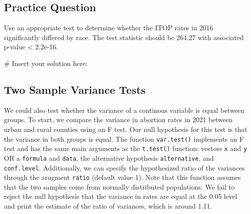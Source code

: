 \documentclass[
  letterpaper,
]{krantz}
\makeatletter
\newenvironment{Shaded}{\begin{snugshade}}{\end{snugshade}}
\newcommand{\CommentTok}[1]{\textcolor[rgb]{0.37,0.37,0.37}{#1}}
\newcommand{\FunctionTok}[1]{\textcolor[rgb]{0.28,0.35,0.67}{#1}}
\newcommand{\NormalTok}[1]{\textcolor[rgb]{0.00,0.23,0.31}{#1}}
\newcommand{\OtherTok}[1]{\textcolor[rgb]{0.00,0.23,0.31}{#1}}
\newcommand{\SpecialCharTok}[1]{\textcolor[rgb]{0.37,0.37,0.37}{#1}}
\newenvironment{kframe}{%
\medskip{}
\setlength{\fboxsep}{.8em}
 \def\at@end@of@kframe{}%
 \ifinner\ifhmode%
  \def\at@end@of@kframe{\end{minipage}}%
  \begin{minipage}{\columnwidth}%
 \fi\fi%
 \def\FrameCommand##1{\hskip\@totalleftmargin \hskip-\fboxsep
 \colorbox{shadecolor}{##1}\hskip-\fboxsep
     \hskip-\linewidth \hskip-\@totalleftmargin \hskip\columnwidth}%
 \MakeFramed {\advance\hsize-\width
   \@totalleftmargin\z@ \linewidth\hsize
   \@setminipage}}%
 {\par\unskip\endMakeFramed%
 \at@end@of@kframe}
\renewenvironment{Shaded}{\begin{kframe}}{\end{kframe}}
\makeatother
\begin{document}
\hypertarget{practice-question-18}{%
\subsection{Practice Question}\label{practice-question-18}}

Use an appropriate test to determine whether the ITOP rates in 2016
significantly differed by race. The test statistic should be 264.27 with
associated p-value \textless{} 2.2e-16.

\begin{Shaded}
\begin{Highlighting}[]
\CommentTok{\# Insert your solution here:}
\end{Highlighting}
\end{Shaded}

\hypertarget{two-sample-variance-tests}{%
\subsection{Two Sample Variance Tests}\label{two-sample-variance-tests}}

We could also test whether the variance of a continous variable is equal
between groups. To start, we compare the variance in abortion rates in
2021 between urban and rural counties using an F test. Our null
hypothesis for this test is that the variance in both groups is equal.
The function \texttt{var.test()} implements an F test and has the same
main arguments as the \texttt{t.test()} function: vectors \texttt{x} and
\texttt{y} OR a \texttt{formula} and \texttt{data}, the alternative
hypothesis \texttt{alternative}, and \texttt{conf.level}. Additionally,
we can specify the hypothesized ratio of the variances through the
arugment \texttt{ratio} (default value 1). Note that this function
assumes that the two samples come from normally distributed populations.
We fail to reject the null hypothesis that the variance in rates are
equal at the 0.05 level and print the estimate of the ratio of
variances, which is around 1.11.

\begin{Shaded}
\end{Shaded}
\end{document}
